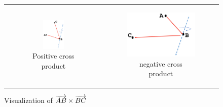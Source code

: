 \documentclass [12pt]{article}
\begin{document}
\begin{enumerate}[label=(\alph*)]
            \begin{figure}[h]
                \begin{tabular}{cc}
                    \begin{subfigure}{0.5\textwidth}
                        \centering 
                        \includegraphics[width=0.4\textwidth]{images/ccwRightHand.PNG}
                        \caption{Positive cross product}
                        \label{fig:ccwtriangle}
                    \end{subfigure}
                    & 
                    \begin{subfigure}{0.5\textwidth}
                        \centering 
                        \includegraphics[width=.7\textwidth]{images/cwRightHand.PNG}
                        \caption{negative cross product}
                        \label{fig:cwtriangle}
                    \end{subfigure} 
                \end{tabular}
                \caption{Visualization of $\protect\overrightarrow{AB} \times \protect\overrightarrow{BC}$}
                \label{fig:1a}
            \end{figure}


\end{enumerate}
\end{document}
